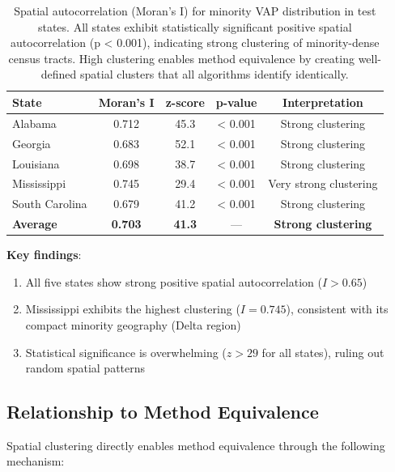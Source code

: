 \begin{table}[h]
\centering
\begin{tabular}{lcccc}
\toprule
\textbf{State} & \textbf{Moran's I} & \textbf{z-score} & \textbf{p-value} & \textbf{Interpretation} \\
\midrule
Alabama & 0.712 & 45.3 & < 0.001 & Strong clustering \\
Georgia & 0.683 & 52.1 & < 0.001 & Strong clustering \\
Louisiana & 0.698 & 38.7 & < 0.001 & Strong clustering \\
Mississippi & 0.745 & 29.4 & < 0.001 & Very strong clustering \\
South Carolina & 0.679 & 41.2 & < 0.001 & Strong clustering \\
\midrule
\textbf{Average} & \textbf{0.703} & \textbf{41.3} & --- & \textbf{Strong clustering} \\
\bottomrule
\end{tabular}
\caption{Spatial autocorrelation (Moran's I) for minority VAP distribution in test states. All states exhibit statistically significant positive spatial autocorrelation (p < 0.001), indicating strong clustering of minority-dense census tracts. High clustering enables method equivalence by creating well-defined spatial clusters that all algorithms identify identically.}
\label{tab:spatial-autocorrelation-supp}
\end{table}

\textbf{Key findings}:
\begin{enumerate}
    \item All five states show strong positive spatial autocorrelation ($I > 0.65$)
    \item Mississippi exhibits the highest clustering ($I = 0.745$), consistent with its compact minority geography (Delta region)
    \item Statistical significance is overwhelming ($z > 29$ for all states), ruling out random spatial patterns
\end{enumerate}

\subsection{Relationship to Method Equivalence}

Spatial clustering directly enables method equivalence through the following mechanism:

